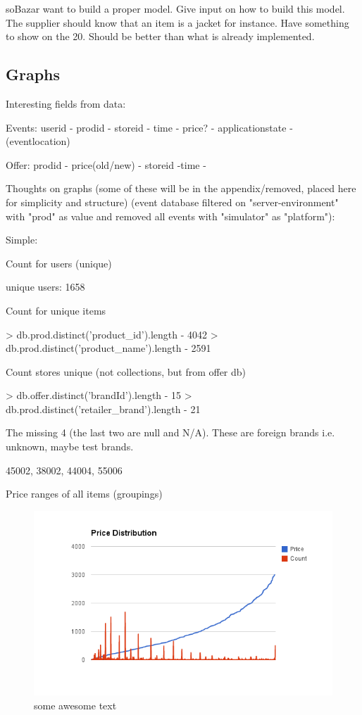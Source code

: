soBazar want to build a proper model.  Give input on how to build this model.
The supplier should know that an item is a jacket for instance.  Have something
to show on the 20. Should be better than what is already implemented.

\subsection{Graphs}

Interesting fields from data:

    Events: userid - prodid - storeid - time - price? - applicationstate - (eventlocation)

    Offer: prodid - price(old/new) - storeid -time -

Thoughts on graphs (some of these will be in the appendix/removed, placed here
for simplicity and structure) (event database filtered on "server-environment"
with "prod" as value and removed all events with "simulator" as "platform"):



    Simple:

        Count for users (unique)

        unique users: 1658


        Count for unique items

        > db.prod.distinct('product\_id').length - 4042
        > db.prod.distinct('product\_name').length - 2591



        Count stores unique (not collections, but from offer db)

        > db.offer.distinct('brandId').length - 15
        > db.prod.distinct('retailer\_brand').length - 21

        The missing 4 (the last two are null and N/A). These are foreign brands i.e. unknown, maybe test brands.

        45002,
        38002,
        44004,
        55006


        Price ranges of all items (groupings)

\begin{figure}[H]
    \includegraphics[width=5in]{image/price_distr.png}
    \centering
    \caption[Price distribution of items]{some awesome text}
    \label{figure:ratingdistr}
\end{figure}

